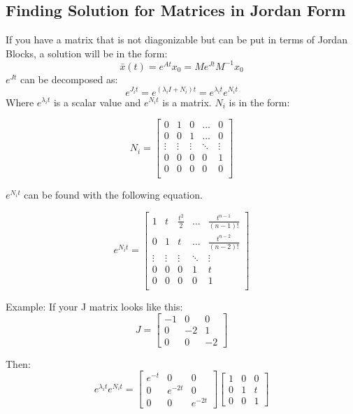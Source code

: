 \documentclass[12pt]{article}
\begin{document}
\subsection*{Finding Solution for Matrices in Jordan Form}
If you have a matrix that is not diagonizable but can be put in terms of Jordan Blocks, a solution will be in the form:
$$\bar{x}(t)=e^{At}x_0=Me^{Jt}M^{-1}x_0$$
$e^{Jt}$ can be decomposed as:
$$e^{J_it}=e^{(\lambda_iI+N_i)t}=e^{\lambda_it}e^{N_it}$$
Where $e^{\lambda_it}$ is a scalar value and $e^{N_it}$ is a matrix. $N_i$ is in the form:

$$
N_i=\begin{bmatrix} 
0 & 1 & 0 & \dots & 0 \\
0 & 0 & 1 & \dots & 0 \\
\vdots & \vdots & \vdots & \ddots & \vdots \\
0 & 0 & 0 & 0 & 1 \\
0 & 0 & 0 & 0 & 0\\
\end{bmatrix}
$$

$e^{N_it}$ can be found with the following equation.

$$e^{N_it}=\begin{bmatrix} 1 & t & \frac{t^2}{2} & \dots & \frac{t^{n-1}}{(n-1)!} \\
0 & 1 & t & \dots & \frac{t^{n-2}}{(n-2)!} \\
\vdots & \vdots & \vdots & \ddots & \vdots \\
0 & 0 & 0 & 1 & t \\
0 & 0 & 0 & 0 & 1\\
\end{bmatrix}$$ 

Example: If your J matrix looks like this:
$$J=\begin{bmatrix}
-1 & 0 & 0 \\
0 & -2 & 1 \\
0 & 0 & -2
\end{bmatrix}$$

Then:
$$e^{\lambda_it}e^{N_it} = 
\begin{bmatrix}
e^{-t} & 0 & 0 \\
0 & e^{-2t} & 0 \\
0 & 0 & e^{-2t}
\end{bmatrix}
\begin{bmatrix}
1 & 0 & 0 \\
0 & 1 & t \\
0 & 0 & 1
\end{bmatrix}
$$
\end{document}

